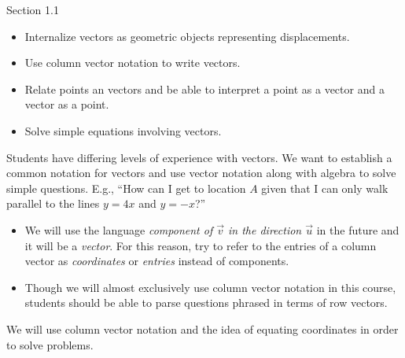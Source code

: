 \begin{lesson}

	 Section 1.1

	\begin{itemize}
		\item Internalize vectors as geometric objects representing displacements.

		\item Use column vector notation to write vectors.

		\item Relate points an vectors and be able to interpret a point as
			a vector and a vector as a point.

		\item Solve simple equations involving vectors.
	\end{itemize}

	 Students have differing levels of experience with vectors.
	We want to establish a common notation for vectors and use vector notation
	along with algebra to solve simple questions. E.g., ``How can I get to location
	$A$ given that I can only walk parallel to the lines $y=4x$ and $y=-x$?''


	\begin{annotation}
		\begin{notes}
			\begin{itemize}
			\item
			We will use the language \emph{component of $\vec v$ in
			the direction $\vec u$} in the future and it will be a \emph{vector}.
			For this reason, try to refer to the entries of a column
			vector as \emph{coordinates} or \emph{entries} instead of components.

			\item
			Though we will almost exclusively use
			column vector notation in this course, students should be able to parse
			questions phrased in terms of row vectors.
			\end{itemize}
		\end{notes}
	\end{annotation}We will use column vector notation and the idea of equating
	coordinates in order to solve problems.

\end{lesson}

